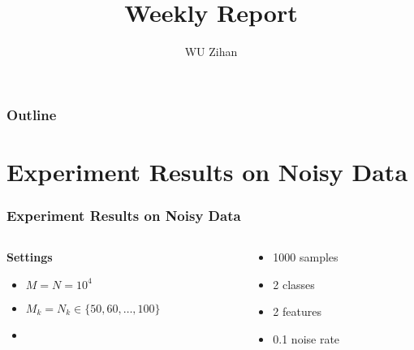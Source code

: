 \documentclass{beamer}
\title{Weekly Report}
\author{WU Zihan}
\begin{document}
\maketitle
\begin{frame}
    \frametitle{Outline}
    \tableofcontents
\end{frame}

\section{Experiment Results on Noisy Data}
\begin{frame}
    \frametitle{Experiment Results on Noisy Data}
    \begin{columns}
        \begin{column}{0.5\textwidth}
            \textbf{Settings}
            \begin{itemize}
                \item $M = N = 10^4$
                \item $M_k = N_k \in \{50, 60, \dots, 100\}$
                \item 
            \end{itemize}
        \end{column}
        \begin{column}{0.5\textwidth}
            \begin{itemize}
                \item 1000 samples
                \item 2 classes
                \item 2 features
                \item 0.1 noise rate
            \end{itemize}
        \end{column}
    \end{columns}

\end{frame}
\end{document}
